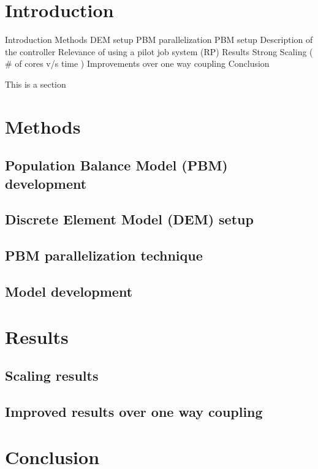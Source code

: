 \documentclass[fleqn,twoside,10pt]{article}
\begin{document}

\section{Introduction}
Introduction
Methods 
DEM setup
PBM parallelization 
PBM setup
Description of the controller
Relevance of using a pilot job system (RP)
Results
Strong Scaling ( \# of cores v/s time )
Improvements over one way coupling
Conclusion

This is a section
\section{Methods}
\subsection{Population Balance Model (PBM) development}
\subsection{Discrete Element Model (DEM) setup}
\subsection{PBM parallelization technique}
\subsection{Model development}
\section{Results}
\subsection{Scaling results}
\subsection{Improved results over one way coupling}
\section{Conclusion}


{\small\bibsep=0pt

}
\end{document}
